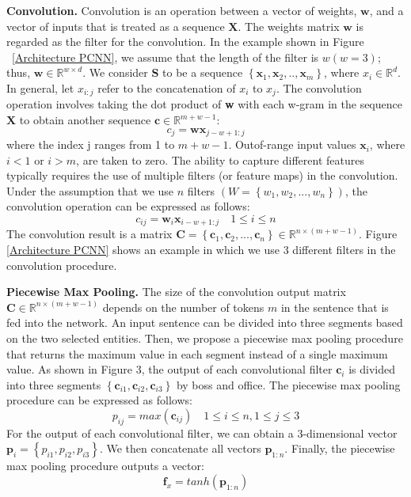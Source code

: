\documentclass[conference]{IEEEtran}
\begin{document}
\textbf{Convolution.}
Convolution is an operation between a vector of weights,
$\mathbf{w}$, and a vector of inputs that is treated as a sequence $\mathbf{X}$.
The weights matrix $\mathbf{w}$ is regarded as the filter for the convolution. 
In the example shown in Figure ~\ref{Architecture PCNN},
we assume that the length of the filter is $w (w=3) $;
thus, $\mathbf{w} \in \mathbb{R}^{w \times d}$.
We consider \textbf{S} to be a sequence $\left \{\mathbf{x}_1, \mathbf{x}_2, .., \mathbf{x}_m  \right \}$,
where $x_i \in \mathbb{R}^d$.
In general,
let $x_{i:j}$ refer to the concatenation of $x_i$ to $x_j$.
The convolution operation involves taking the dot product of \textbf{w} with each w-gram in the sequence $\mathbf{X}$ to obtain another sequence $\mathbf{c} \in \mathbb{R}^{m+w-1}$:
\begin{equation}
  c_j = \mathbf{w}\mathbf{x}_{j-w+1:j} 
\end{equation}
where the index j ranges from 1 to $m+w-1$.
Outof-range input values $\mathbf{x}_i$, where $i < 1$ or $i > m$, 
are taken to zero.
The ability to capture different features typically requires the use of multiple filters (or feature maps) in the convolution.
Under the assumption that we use $n$ filters $( W = \left\{{ w_1, w_2, ..., w_n} \right\})$,
the convolution operation can be expressed as follows:
\begin{equation}
  c_{ij} = \mathbf{w}_i\mathbf{x}_{i-w+1:j} \quad 1 \leq i \leq n
\end{equation}
The convolution result is a matrix $\mathbf{C} = \left\{\mathbf{c}_1, \mathbf{c}_2, ..., \mathbf{c}_n\right\} \in \mathbb{R}^{n\times(m+w-1)}$.
Figure \ref{Architecture PCNN} shows an example in which we use 3 different filters in the convolution procedure.

\textbf{Piecewise Max Pooling.}
The size of the convolution output matrix $\mathbf{C} \in \mathbb{R}^{n\times(m+w-1)} $ depends on the number of tokens $m$ in the sentence that is fed into the network.
An input sentence can be divided into three segments based on the two selected entities. 
Then, we propose a piecewise max pooling procedure that returns the maximum value in each segment instead of a single maximum value. 
As shown in Figure 3, the output of each convolutional filter $\mathbf{c}_i$ is divided into three segments $\left\{\mathbf{c}_{i1},\mathbf{c}_{i2},\mathbf{c}_{i3}\right\}$
by boss and office.
The piecewise max pooling procedure can be expressed as follows:
\begin{equation}
  p_{ij} = max(\mathbf{c}_{ij}) \quad 1 \leq i \leq n,1 \leq j \leq 3
\end{equation}
For the output of each convolutional filter,
we can obtain a 3-dimensional vector $\mathbf{p}_i = \left\{p_{i1},p_{i2},p_{i3}\right\}$.
We then concatenate all vectors $\mathbf{p}_{1:n}$.
Finally,
the piecewise max pooling procedure outputs a vector:
\begin{equation}
  \mathbf{f}_x = tanh(\mathbf{p}_{1:n})
\end{equation}
\end{document}
